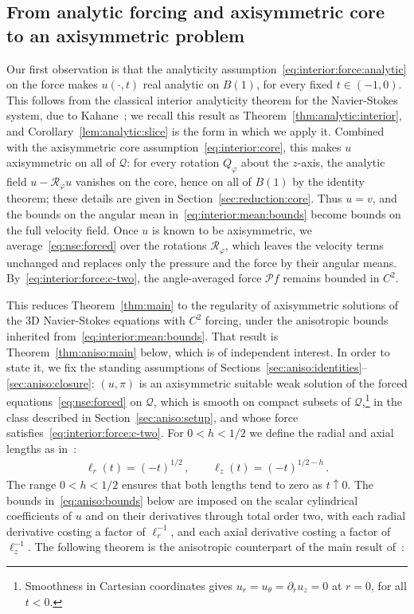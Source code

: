 \documentclass[11pt,reqno]{amsproc}
\numberwithin{equation}{section}
\theoremstyle{remark}
\newcommand{\p}{\partial}
\begin{document}
\subsection{From analytic forcing and axisymmetric core to an axisymmetric problem}
\label{sec:aniso:axisymmetric}

Our first observation is that the analyticity assumption~\eqref{eq:interior:force:analytic} on the force makes $u(\cdot,t)$ real analytic on $B(1)$, for every fixed $t\in(-1,0)$. This follows from the classical interior analyticity theorem for the Navier-Stokes system, due to Kahane~\cite[Theorem~1.2 and p.~387]{Kahane69}; we recall this result as Theorem~\ref{thm:analytic:interior}, and Corollary~\ref{lem:analytic:slice} is the form in which we apply it. Combined with the axisymmetric core assumption~\eqref{eq:interior:core}, this makes $u$ axisymmetric on all of $\mathcal Q$: for every rotation $Q_\varphi$ about the $z$-axis, the analytic field $u-\mathscr R_\varphi u$ vanishes on the core, hence on all of $B(1)$ by the identity theorem; these details are given in Section~\ref{sec:reduction:core}. Thus $u=v$, and the bounds on the angular mean in~\eqref{eq:interior:mean:bounds} become bounds on the full velocity field. Once $u$ is known to be axisymmetric, we average~\eqref{eq:nse:forced} over the rotations $\mathscr R_\varphi$, which leaves the velocity terms unchanged and replaces only the pressure and the force by their angular means. By~\eqref{eq:interior:force:c-two}, the angle-averaged force $\mathcal Pf$ remains bounded in $C^2$.

This reduces Theorem~\ref{thm:main} to the regularity of axisymmetric solutions of the 3D Navier-Stokes equations with $C^2$ forcing, under the anisotropic bounds inherited from~\eqref{eq:interior:mean:bounds}. That result is Theorem~\ref{thm:aniso:main} below, which is of independent interest. In order to state it, we fix the standing assumptions of Sections~\ref{sec:aniso:identities}--\ref{sec:aniso:closure}: $(u,\pi)$ is an axisymmetric suitable weak solution of the forced equations~\eqref{eq:nse:forced} on $\mathcal Q$, which is smooth on compact subsets of $\mathcal Q$,\footnote{Smoothness in Cartesian coordinates gives $u_r=u_\theta=\p_ru_z=0$ at $r=0$, for all $t<0$.} in the class described in Section~\ref{sec:aniso:setup}, and whose force satisfies~\eqref{eq:interior:force:c-two}. For $0<h<1/2$ we define the radial and axial lengths as in~\cite{OpenAIManuscript}:
\begin{align}
\ell_r(t)=(-t)^{1/2}\,,\qquad \ell_z(t)=(-t)^{1/2-h}
\,.
\label{eq:aniso:lengths}
\end{align}
The range $0<h<1/2$ ensures that both lengths tend to zero as $t\uparrow0$. The bounds in~\eqref{eq:aniso:bounds} below are imposed on the scalar cylindrical coefficients of $u$ and on their derivatives through total order two, with each radial derivative costing a factor of $\ell_r^{-1}$, and each axial derivative costing a factor of $\ell_z^{-1}$. The following theorem is the anisotropic counterpart of the main result of~\cite{CIVEulerLength}:
\end{document}
